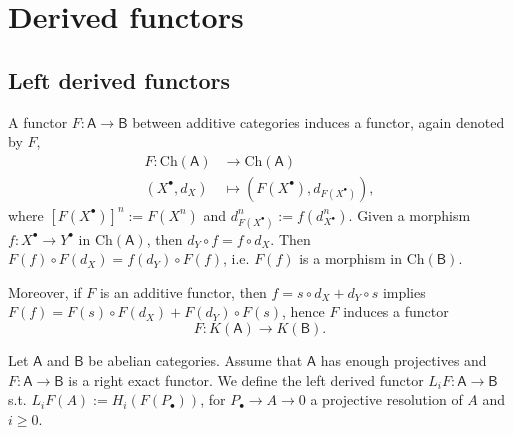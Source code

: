 \section{Derived functors}

\subsection{Left derived functors}
\begin{rem}[]
	A functor $F: \mathsf{A} \to \mathsf{B}$ between additive categories
	induces a functor, again denoted by $F$, 
	\begin{align}
		F: \mathrm{Ch}(\mathsf{A}) &\to \mathrm{Ch}(\mathsf{A}) \\
		\left( X^{\bullet}, d_{X} \right) &\mapsto \left( F(X^{\bullet}), d_{F(X^\bullet)} \right)
	,\end{align} 
	where $\left[ F(X^\bullet) \right]^n := F(X^n)$ and $d_{F(X^\bullet)}^n := f(d^n_{X^\bullet})$.
	Given a morphism $f: X^\bullet \to Y^\bullet$ in $\mathrm{Ch}(\mathsf{A})$, then
	$d_Y \circ f = f \circ d_X$.
	Then $F(f) \circ F(d_X) = f(d_Y) \circ F(f)$, i.e. $F(f)$ is a morphism in $\mathrm{Ch}(\mathsf{B})$.

	Moreover, if $F$ is an additive functor, then
	$f = s \circ d_X + d_Y \circ s$ implies
	$F(f) = F(s) \circ F(d_X) + F(d_Y) \circ F(s)$,
	hence $F$ induces a functor
	\begin{equation}
		F: K(\mathsf{A}) \to K(\mathsf{B})
	.\end{equation} 
\end{rem}

\begin{defn}
	Let $\mathsf{A}$ and $\mathsf{B}$ be abelian categories.
	Assume that $\mathsf{A}$ has enough projectives and $F: \mathsf{A} \to \mathsf{B}$
	is a right exact functor.
	We define the left derived functor $L_iF: \mathsf{A} \to \mathsf{B}$
	s.t. $L_iF(A) := H_i \left( F(P_{\bullet}) \right)$, 
	for $P_{\bullet} \to A \to 0$ a projective resolution of $A$
	and $i \geq 0$.
\end{defn}

